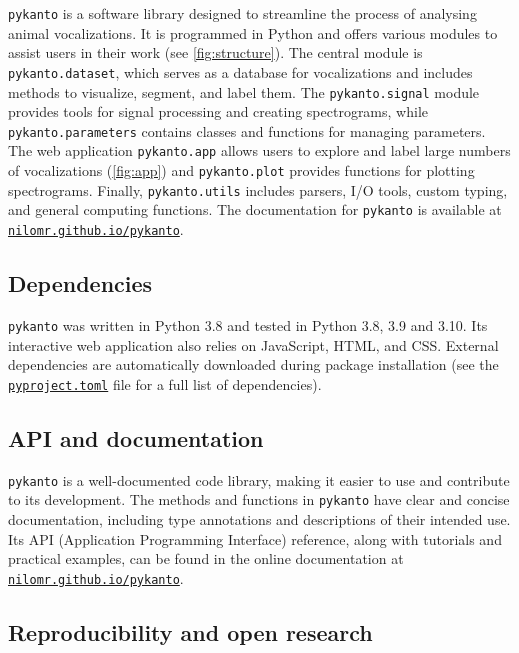 \texttt{pykanto} is a software library designed to streamline the process of
analysing animal vocalizations. It is programmed in Python and offers various
modules to assist users in their work (see \autoref{fig:structure}). The central module is
\texttt{pykanto.dataset}, which serves as a database for vocalizations and
includes methods to visualize, segment, and label them. The \texttt{pykanto.signal} module provides tools for
signal processing and creating spectrograms, while \texttt{pykanto.parameters}
contains classes and functions for managing parameters. The web application
\texttt{pykanto.app} allows users to explore and label large numbers of
vocalizations (\autoref{fig:app}) and \texttt{pykanto.plot} provides functions for
plotting spectrograms. Finally, \texttt{pykanto.utils} includes parsers, I/O
tools, custom typing, and general computing functions. The documentation for
\texttt{pykanto} is available at
\href{https://nilomr.github.io/pykanto}{\nolinkurl{nilomr.github.io/pykanto}}.

\subsection{Dependencies}

\texttt{pykanto} was written in Python 3.8 and tested in Python 3.8, 3.9 and
3.10. Its interactive web application also relies on JavaScript, HTML, and CSS.
External dependencies are automatically downloaded during package installation
(see the
\href{https://github.com/nilomr/pykanto/blob/main/pyproject.toml}{\texttt{pyproject.toml}}
file for a full list of dependencies).

\subsection{API and documentation}

\texttt{pykanto} is a well-documented code library, making it easier to use and
contribute to its development. The methods and functions in \texttt{pykanto} have clear
and concise documentation, including type annotations and descriptions of their
intended use. Its API (Application Programming Interface) reference, along with
tutorials and practical examples, can be found in the online documentation
at \href{https://nilomr.github.io/pykanto}{\nolinkurl{nilomr.github.io/pykanto}}.

\subsection{Reproducibility and open research}

